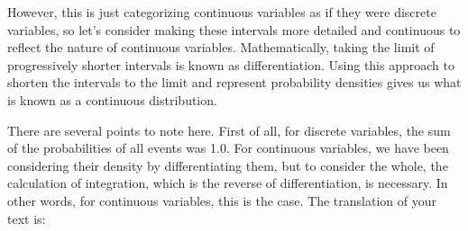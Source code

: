 \documentclass{ltjbook}
\begin{document}
However, this is just categorizing continuous variables as if they were discrete variables, so let's consider making these intervals more detailed and continuous to reflect the nature of continuous variables. Mathematically, taking the limit of progressively shorter intervals is known as differentiation. Using this approach to shorten the intervals to the limit and represent probability densities gives us what is known as a continuous distribution.

There are several points to note here. First of all, for discrete variables, the sum of the probabilities of all events was 1.0. For continuous variables, we have been considering their density by differentiating them, but to consider the whole, the calculation of integration, which is the reverse of differentiation, is necessary. In other words, for continuous variables, this is the case.
The translation of your text is:
\end{document}
